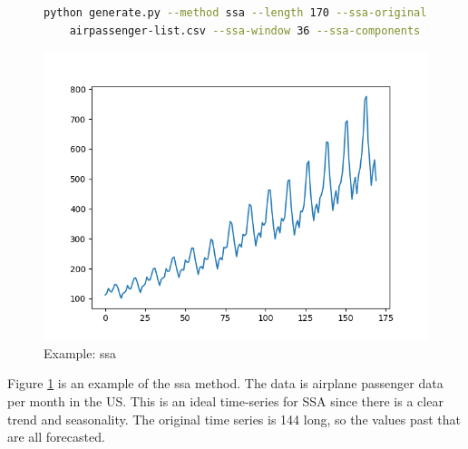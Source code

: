 \begin{figure}
\begin{lstlisting}[language=bash]
    python generate.py --method ssa --length 170 --ssa-original \
    airpassenger-list.csv --ssa-window 36 --ssa-components 13 --display
\end{lstlisting}
\includegraphics[scale=0.7]{figures/ssa}
\caption{Example: ssa}    
\label{fig:ssa-example}
\end{figure}

Figure \ref{fig:ssa-example} is an example of the ssa method. The data is airplane passenger data per month in the US. This is an ideal time-series for SSA since there is a clear trend and seasonality. The original time series is 144 long, so the values past that are all forecasted.
